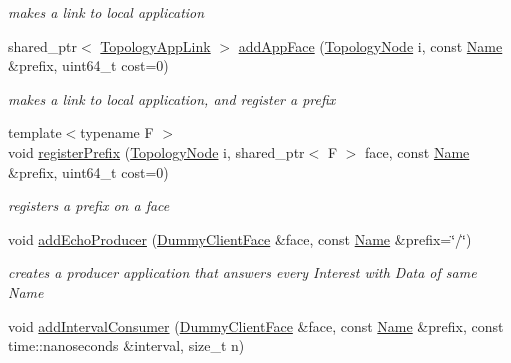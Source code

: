 \begin{DoxyCompactItemize}
\begin{DoxyCompactList}\small\item\em makes a link to local application \end{DoxyCompactList}\item 
shared\+\_\+ptr$<$ \hyperlink{classnfd_1_1fw_1_1tests_1_1TopologyAppLink}{Topology\+App\+Link} $>$ \hyperlink{classnfd_1_1fw_1_1tests_1_1TopologyTester_a44db569529405448019ca0b1c93d97da}{add\+App\+Face} (\hyperlink{topology-tester_8hpp_a65eed57bba998574cb3a2e62126f33e8}{Topology\+Node} i, const \hyperlink{classndn_1_1Name}{Name} \&prefix, uint64\+\_\+t cost=0)\hypertarget{classnfd_1_1fw_1_1tests_1_1TopologyTester_a44db569529405448019ca0b1c93d97da}{}\label{classnfd_1_1fw_1_1tests_1_1TopologyTester_a44db569529405448019ca0b1c93d97da}

\begin{DoxyCompactList}\small\item\em makes a link to local application, and register a prefix \end{DoxyCompactList}\item 
{\footnotesize template$<$typename F $>$ }\\void \hyperlink{classnfd_1_1fw_1_1tests_1_1TopologyTester_ae7f94267b9dba9be65f489887274ae0b}{register\+Prefix} (\hyperlink{topology-tester_8hpp_a65eed57bba998574cb3a2e62126f33e8}{Topology\+Node} i, shared\+\_\+ptr$<$ F $>$ face, const \hyperlink{classndn_1_1Name}{Name} \&prefix, uint64\+\_\+t cost=0)
\begin{DoxyCompactList}\small\item\em registers a prefix on a face \end{DoxyCompactList}\item 
void \hyperlink{classnfd_1_1fw_1_1tests_1_1TopologyTester_aa4241545dd170380ef5c013d49738db8}{add\+Echo\+Producer} (\hyperlink{classndn_1_1util_1_1DummyClientFace}{Dummy\+Client\+Face} \&face, const \hyperlink{classndn_1_1Name}{Name} \&prefix=\char`\"{}/\char`\"{})\hypertarget{classnfd_1_1fw_1_1tests_1_1TopologyTester_aa4241545dd170380ef5c013d49738db8}{}\label{classnfd_1_1fw_1_1tests_1_1TopologyTester_aa4241545dd170380ef5c013d49738db8}

\begin{DoxyCompactList}\small\item\em creates a producer application that answers every Interest with Data of same Name \end{DoxyCompactList}\item 
void \hyperlink{classnfd_1_1fw_1_1tests_1_1TopologyTester_a240b16af90600d802bbec56f8455b832}{add\+Interval\+Consumer} (\hyperlink{classndn_1_1util_1_1DummyClientFace}{Dummy\+Client\+Face} \&face, const \hyperlink{classndn_1_1Name}{Name} \&prefix, const time\+::nanoseconds \&interval, size\+\_\+t n)\hypertarget{classnfd_1_1fw_1_1tests_1_1TopologyTester_a240b16af90600d802bbec56f8455b832}{}\label{classnfd_1_1fw_1_1tests_1_1TopologyTester_a240b16af90600d802bbec56f8455b832}


\end{DoxyCompactItemize}
